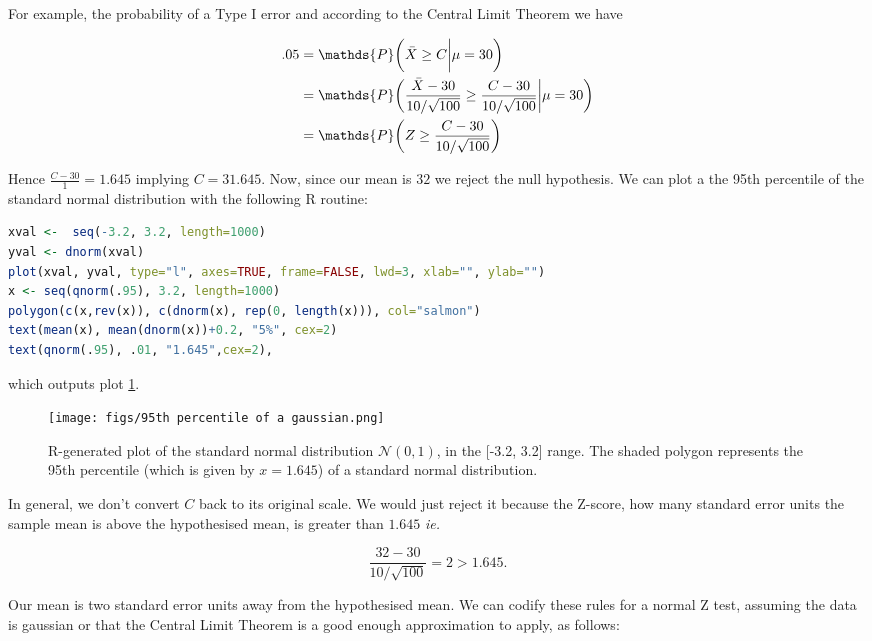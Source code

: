 \documentclass{homework}
\begin{document}
For example, the probability of a Type I error and according to the Central Limit Theorem we have  

\begin{align*}
        .05 &= \mathds{P}\bigg(\Bar{X}\geq C \bigg| \mu = 30 \bigg) \\
        &=\mathds{P}\bigg(\frac{\Bar{X}-30}{10/\sqrt{100}}\geq \frac{C-30}{10/\sqrt{100}} \bigg| \mu = 30 \bigg) \\
        &= \mathds{P}\bigg(Z\geq \frac{C-30}{10/\sqrt{100}}\bigg)
\end{align*}

Hence $\frac{C-30}{1}=1.645$ implying $C=31.645$. Now, since our mean is $32$ we reject the null hypothesis. We can plot a the 95th percentile of the standard normal distribution with the following R routine:

\clearpage

\begin{lstlisting}[language=R]
xval <-  seq(-3.2, 3.2, length=1000)
yval <- dnorm(xval)
plot(xval, yval, type="l", axes=TRUE, frame=FALSE, lwd=3, xlab="", ylab="")
x <- seq(qnorm(.95), 3.2, length=1000)
polygon(c(x,rev(x)), c(dnorm(x), rep(0, length(x))), col="salmon")
text(mean(x), mean(dnorm(x))+0.2, "5%", cex=2)
text(qnorm(.95), .01, "1.645",cex=2),
\end{lstlisting} 

which outputs plot \ref{fig: normal Z test}. 

\begin{figure}
    \centering
    \texttt{[image: figs/95th percentile of a gaussian.png]} 
    \caption{R-generated plot of the standard normal distribution $\mathcal{N}(0,1)$,  in the [-3.2, 3.2] range. The shaded polygon represents the 95th percentile (which is given by $x=1.645$) of a standard normal distribution. }
    \label{fig: normal Z test}
\end{figure}

In general, we don't convert $C$ back to its original scale. We would just reject it because the Z-score, how many standard error units the sample mean is above the hypothesised mean, is greater than $1.645$ \textit{ie. }

$$
\frac{32-30}{10/\sqrt{100}} = 2 > 1.645.
$$

Our mean is two standard error units away from the hypothesised mean. We can codify these rules for a normal Z test, assuming the data is gaussian or that the Central Limit Theorem is a good enough approximation to apply, as follows:
\end{document}
